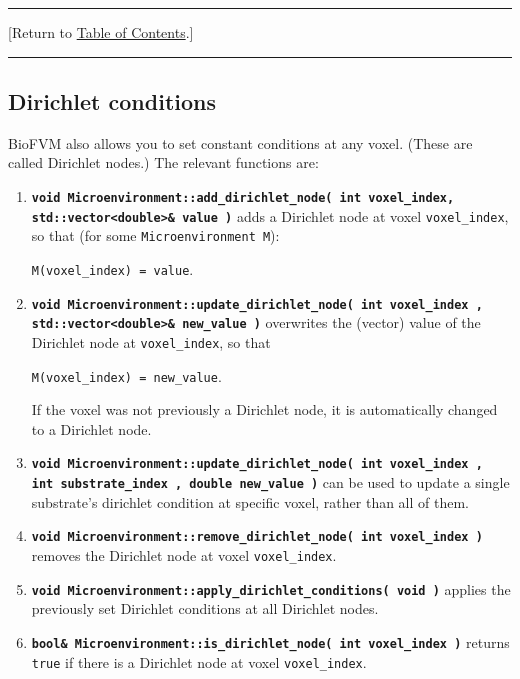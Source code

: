 \documentclass[12pt]{article}
\renewcommand{\v}{\verb}
\newcommand{\smallcode}[1]{\textbf{\texttt{#1}}}
\newcommand{\TOClink}{\begin{center}\hrule\vskip-5pt\phantom{.}\hfill[Return to \hyperlink{TOC}{Table of Contents}.]\hfill\phantom{.}\vskip3pt\hrule\end{center}}
\begin{document}
\TOClink 

\subsection{Dirichlet conditions}
\label{sec:Dirichlet}

BioFVM also allows you to set constant conditions at any 
voxel. (These are called Dirichlet nodes.) The relevant functions 
are: 

\begin{enumerate}
\item 
\smallcode{void Microenvironment::add\_dirichlet\_node( int voxel\_index, \\
\phantom{void } std::vector<double>\& value )} adds a Dirichlet node at voxel \v|voxel_index|, so that (for some \v|Microenvironment M|):

\v|M(voxel_index) = value|. 

\item 
\smallcode{void Microenvironment::update\_dirichlet\_node( int voxel\_index ,
 \\ \phantom{void }std::vector<double>\& new\_value )} overwrites the (vector) 
 value of the Dirichlet node at \v|voxel_index|, so that 

\v|M(voxel_index) = new_value|.  

If the voxel was not previously a Dirichlet node, it is automatically 
changed to a Dirichlet node. 

\item 
\smallcode{void Microenvironment::update\_dirichlet\_node( int voxel\_index , \\ 
\phantom{void }int substrate\_index , double new\_value )} can be used to 
update a single substrate's dirichlet condition at specific voxel, rather than all of them. 

\item 
\smallcode{void Microenvironment::remove\_dirichlet\_node( int voxel\_index )} 
removes the Dirichlet node at voxel \v|voxel_index|. 

\item 
\smallcode{void Microenvironment::apply\_dirichlet\_conditions( void )} 
applies the previously set Dirichlet conditions at all Dirichlet nodes. 

\item
\smallcode{bool\& Microenvironment::is\_dirichlet\_node( int voxel\_index )} 
returns \v|true| if there is a Dirichlet node at voxel 
\v|voxel_index|. 
\end{enumerate}
 
\end{document}
